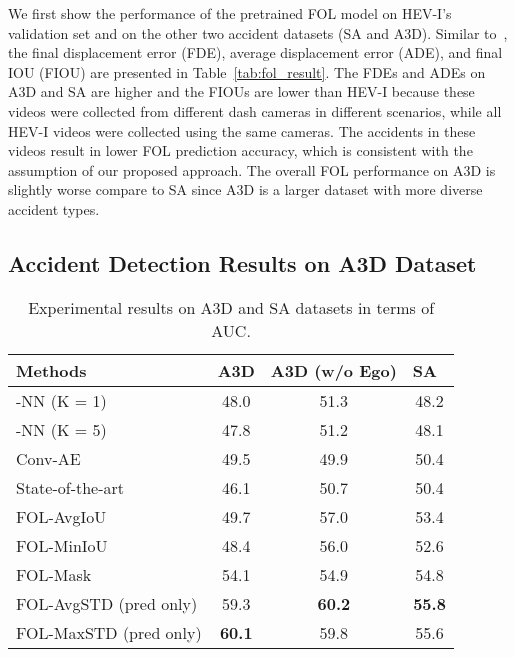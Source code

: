 \documentclass[letterpaper, 10 pt, conference]{ieeeconf}
\theoremstyle{definition}
\theoremstyle{remark}
\begin{document}
We first show the performance of the pretrained FOL model on HEV-I's
validation set and on the other two accident datasets (SA and A3D).
Similar to~\cite{yao2018egocentric}, 
the final displacement error (FDE), 
average displacement error (ADE), and final IOU (FIOU) are presented 
in Table~\ref{tab:fol_result}. The FDEs and ADEs on A3D 
and SA are higher and the FIOUs are lower than HEV-I because these 
videos were collected 
from different dash cameras in different scenarios, while all HEV-I 
videos were collected using the same cameras. 
The accidents in these videos result in 
lower FOL prediction accuracy, which is consistent with the 
assumption of our proposed approach.
The overall FOL performance on A3D is slightly 
worse compare to SA since A3D is a larger dataset with more diverse 
accident types.

\subsection{Accident Detection Results on A3D Dataset}

\begin{table}[t]
    \vspace{5pt}
    \centering
    \renewcommand{\arraystretch}{1.3}
    \caption{Experimental results on A3D and SA datasets in terms of AUC.}
    \label{tab:results}
    \begin{tabular}{lccc}
        \toprule
        Methods & A3D & A3D (w/o Ego) & SA~\cite{chan2016anticipating} \\
        \midrule
-NN (K = 1)  & 48.0 & 51.3 & 48.2 \\
        -NN (K = 5)  & 47.8 & 51.2 & 48.1 \\
        Conv-AE\cite{hasan2016learning} & 49.5 & 49.9 & 50.4 \\
        State-of-the-art~\cite{liu2018future}  & 46.1  & 50.7 & 50.4 \\
        \midrule
        FOL-AvgIoU   & 49.7 & 57.0 & 53.4  \\
        FOL-MinIoU   & 48.4 & 56.0 & 52.6 \\
        FOL-Mask  & 54.1 & 54.9 & 54.8 \\
        FOL-AvgSTD (pred only)   & 59.3 & \textbf{60.2} & \textbf{55.8} \\
        FOL-MaxSTD (pred only)   & \textbf{60.1} & 59.8 & 55.6 \\
        \bottomrule
    \end{tabular}
    \vspace{-10pt}
\end{table}
\end{document}
